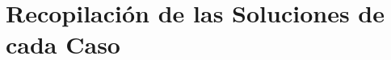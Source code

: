 \graphicspath{{anexos/AnexoF-Recopilacion-Soluciones-Por-Fases/recursos/}}

\section{Recopilación de las Soluciones de cada Caso} \label{Anexo:recopilacion-soluciones-por-fases}
